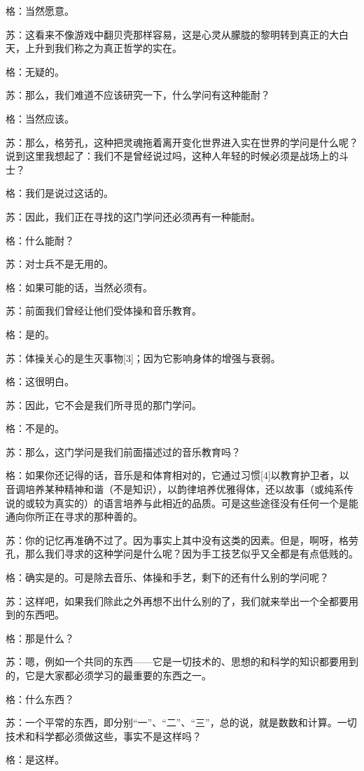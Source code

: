\documentclass[12pt,oneside]{book}
\begin{document}
格：当然愿意。

苏：这看来不像游戏中翻贝壳那样容易，这是心灵从朦胧的黎明转到真正的大白天，上升到我们称之为真正哲学的实在。

格：无疑的。

苏：那么，我们难道不应该研究一下，什么学问有这种能耐？

格：当然应该。

苏：那么，格劳孔，这种把灵魂拖着离开变化世界进入实在世界的学问是什么呢？说到这里我想起了：我们不是曾经说过吗，这种人年轻的时候必须是战场上的斗士？

格：我们是说过这话的。

苏：因此，我们正在寻找的这门学问还必须再有一种能耐。

格：什么能耐？

苏：对士兵不是无用的。

格：如果可能的话，当然必须有。

苏：前面我们曾经让他们受体操和音乐教育。

格：是的。

苏：体操关心的是生灭事物[3]；因为它影响身体的增强与衰弱。

格：这很明白。

苏：因此，它不会是我们所寻觅的那门学问。

格：不是的。

苏：那么，这门学问是我们前面描述过的音乐教育吗？

格：如果你还记得的话，音乐是和体育相对的，它通过习惯[4]以教育护卫者，以音调培养某种精神和谐（不是知识），以韵律培养优雅得体，还以故事（或纯系传说的或较为真实的）的语言培养与此相近的品质。可是这些途径没有任何一个是能通向你所正在寻求的那种善的。

苏：你的记忆再准确不过了。因为事实上其中没有这类的因素。但是，啊呀，格劳孔，那么我们寻求的这种学问是什么呢？因为手工技艺似乎又全都是有点低贱的。

格：确实是的。可是除去音乐、体操和手艺，剩下的还有什么别的学问呢？

苏：这样吧，如果我们除此之外再想不出什么别的了，我们就来举出一个全都要用到的东西吧。

格：那是什么？

苏：嗯，例如一个共同的东西——它是一切技术的、思想的和科学的知识都要用到的，它是大家都必须学习的最重要的东西之一。

格：什么东西？

苏：一个平常的东西，即分别“一”、“二”、“三”，总的说，就是数数和计算。一切技术和科学都必须做这些，事实不是这样吗？

格：是这样。
\end{document}
